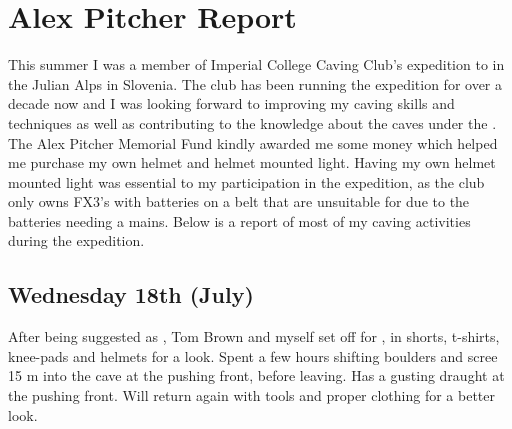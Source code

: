 \section{Alex Pitcher Report}



This summer I was a member of Imperial College Caving Club's expedition to  in the Julian Alps in Slovenia. The club has been running the expedition for over a decade now and I was looking forward to improving my caving skills and techniques as well as contributing to the knowledge about the caves under the . The Alex Pitcher Memorial Fund kindly awarded me some money which helped me purchase my own helmet and helmet mounted light. Having my own helmet mounted light was essential to my participation in the expedition, as the club only owns FX3's with batteries on a belt that are unsuitable for  due to the batteries needing a mains. Below is a report of most of my caving activities during the expedition.


\subsection{Wednesday 18th (July)}

After being suggested as , Tom Brown and myself set off for ,
in shorts, t-shirts, knee-pads and helmets for a look. Spent a few hours
shifting boulders and scree 15 m into the cave at the pushing front,
before leaving. Has a gusting draught at the pushing front. Will return
again with tools and proper clothing for a better look.

